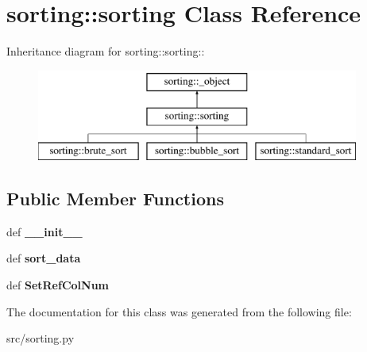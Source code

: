 \hypertarget{classsorting_1_1sorting}{
\section{sorting::sorting Class Reference}
\label{d8/d91/classsorting_1_1sorting}
}
Inheritance diagram for sorting::sorting::\begin{figure}[H]
\begin{center}
\leavevmode
\includegraphics[height=3cm]{d8/d91/classsorting_1_1sorting}
\end{center}
\end{figure}
\subsection*{Public Member Functions}
\begin{DoxyCompactItemize}
\item 
\hypertarget{classsorting_1_1sorting_a487be5019cf669d6d4930ad1a7b4d31e}{
def {\bfseries \_\-\_\-init\_\-\_\-}}
\label{d8/d91/classsorting_1_1sorting_a487be5019cf669d6d4930ad1a7b4d31e}

\item 
\hypertarget{classsorting_1_1sorting_a2c7684816ed4940fb02326561d442cb1}{
def {\bfseries sort\_\-data}}
\label{d8/d91/classsorting_1_1sorting_a2c7684816ed4940fb02326561d442cb1}

\item 
\hypertarget{classsorting_1_1sorting_a4cafa3bef073b1b54155bda4e1f8e216}{
def {\bfseries SetRefColNum}}
\label{d8/d91/classsorting_1_1sorting_a4cafa3bef073b1b54155bda4e1f8e216}

\end{DoxyCompactItemize}


The documentation for this class was generated from the following file:\begin{DoxyCompactItemize}
\item 
src/sorting.py\end{DoxyCompactItemize}
